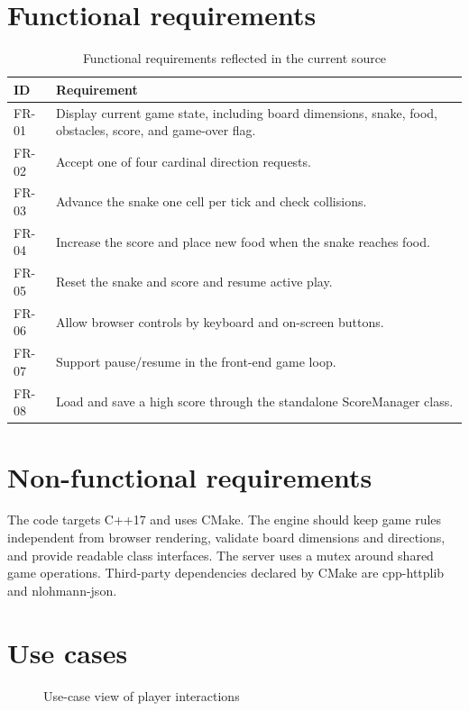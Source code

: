 \documentclass[12pt,a4paper]{report}
\begin{document}
\section{Functional requirements}
\begin{table}[H]
\centering
\caption{Functional requirements reflected in the current source}
\begin{tabular}{p{18mm}p{115mm}}
\toprule
ID & Requirement\\\midrule
FR-01 & Display current game state, including board dimensions, snake, food,
        obstacles, score, and game-over flag.\\
FR-02 & Accept one of four cardinal direction requests.\\
FR-03 & Advance the snake one cell per tick and check collisions.\\
FR-04 & Increase the score and place new food when the snake reaches food.\\
FR-05 & Reset the snake and score and resume active play.\\
FR-06 & Allow browser controls by keyboard and on-screen buttons.\\
FR-07 & Support pause/resume in the front-end game loop.\\
FR-08 & Load and save a high score through the standalone ScoreManager class.\\
\bottomrule
\end{tabular}
\end{table}

\section{Non-functional requirements}
The code targets C++17 and uses CMake. The engine should keep game rules
independent from browser rendering, validate board dimensions and directions,
and provide readable class interfaces. The server uses a mutex around shared
game operations. Third-party dependencies declared by CMake are cpp-httplib and
nlohmann-json.

\section{Use cases}
\begin{figure}[H]
\centering
{}
\caption{Use-case view of player interactions}
\label{fig:usecase}
\end{figure}
\end{document}
